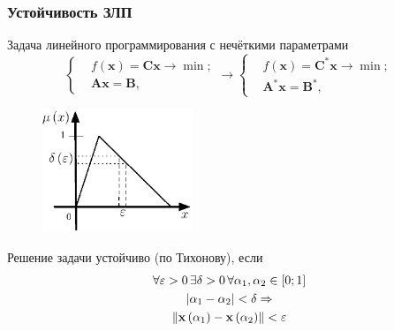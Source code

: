 \documentclass[12pt]{beamer}
\begin{document}
\begin{frame}
  \frametitle{Устойчивость ЗЛП}
  Задача линейного программирования с нечёткими параметрами
    \begin{equation}
      \label{eq:fuzzy-lp-unstable-problem}
      \left\{ \begin{aligned}
        & f\left( \mathbf{x} \right)=\mathbf{Cx}\to \min;  \\ 
        & \mathbf{Ax}=\mathbf{B},
      \end{aligned} \right.
      \to
      \left\{ \begin{aligned}
        & f\left( \mathbf{x} \right)={\mathbf{C}^{*}}\mathbf{x}\to \min;  \\ 
        & {\mathbf{A}^{*}}\mathbf{x}={\mathbf{B}}^{*},
      \end{aligned} \right.
    \end{equation}
    
  \begin{figure}
    \includegraphics[width=0.4\textwidth]{stability}
  \end{figure}

  Решение задачи устойчиво (по Тихонову), если
        \begin{gather}
        \forall \varepsilon >0\, \exists \delta >0\, \forall \alpha_1, \alpha_2 \in \left[0; 1\right] \notag \\
        \left| \alpha_1 - \alpha_2 \right|<\delta \Rightarrow   \notag \\
        \label{eq:fuzzy-solution-stability}
        \left\| \mathbf{x}\left( \alpha_1 \right)-\mathbf{x} \left( \alpha_2  \right) \right\|<\varepsilon
        \end{gather}

\end{frame}

\end{document}
